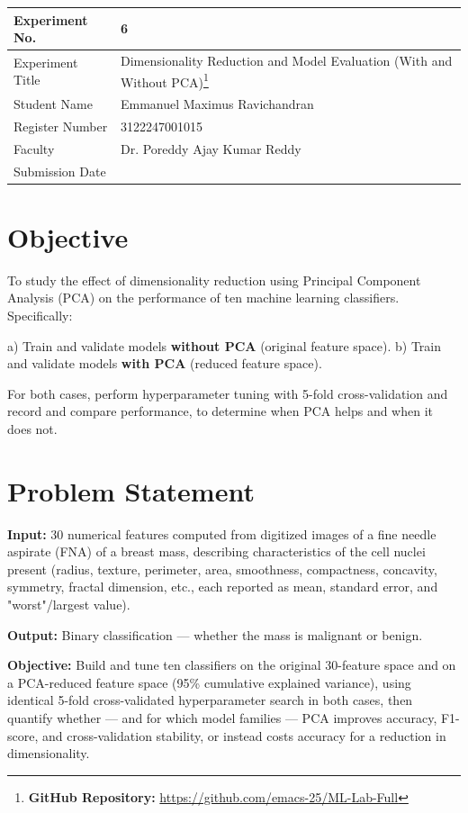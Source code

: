\documentclass[12pt,a4paper]{article}
\author{root}
\date{\today}
\title{}
\begin{document}
\begin{center}
\begin{tabular}{|p{4cm}|p{11cm}|}
\hline
Experiment No. & 6\\[0pt]
\hline
Experiment Title & Dimensionality Reduction and Model Evaluation (With and Without PCA)\footnote{\textbf{GitHub Repository: }\url{https://github.com/emacs-25/ML-Lab-Full}}\\[0pt]
\hline
Student Name & Emmanuel Maximus Ravichandran\\[0pt]
\hline
Register Number & 3122247001015\\[0pt]
\hline
Faculty & Dr. Poreddy Ajay Kumar Reddy\\[0pt]
\hline
Submission Date & \\[0pt]
\hline
\end{tabular}
\end{center}


\section{Objective}
\label{sec:org542cd5d}

To study the effect of dimensionality reduction using Principal Component Analysis (PCA) on the
performance of ten machine learning classifiers. Specifically:

a) Train and validate models \textbf{without PCA} (original feature space).
b) Train and validate models \textbf{with PCA} (reduced feature space).

For both cases, perform hyperparameter tuning with 5-fold cross-validation and record and compare
performance, to determine when PCA helps and when it does not.


\section{Problem Statement}
\label{sec:org10bf950}

\textbf{Input:} 30 numerical features computed from digitized images of a fine needle aspirate (FNA) of
a breast mass, describing characteristics of the cell nuclei present (radius, texture, perimeter,
area, smoothness, compactness, concavity, symmetry, fractal dimension, etc., each reported as
mean, standard error, and "worst"/largest value).

\textbf{Output:} Binary classification — whether the mass is malignant or benign.

\textbf{Objective:} Build and tune ten classifiers on the original 30-feature space and on a PCA-reduced
feature space (95\% cumulative explained variance), using identical 5-fold cross-validated
hyperparameter search in both cases, then quantify whether — and for which model families — PCA
improves accuracy, F1-score, and cross-validation stability, or instead costs accuracy for a
reduction in dimensionality.
\end{document}
